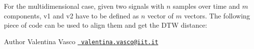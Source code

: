 \begin{DoxyCode}{0}
\end{DoxyCode}


For the multidimensional case, given two signals with $n$ samples over time and $m$ components, v1 and v2 have to be defined as $n$ vector of $m$ vectors. The following piece of code can be used to align them and get the D\+TW distance\+:


\begin{DoxyCode}{0}
\end{DoxyCode}


\begin{DoxyAuthor}{Author}
Valentina Vasco \href{mailto:valentina.vasco@iit.it}{\texttt{ valentina.\+vasco@iit.\+it}} 
\end{DoxyAuthor}
